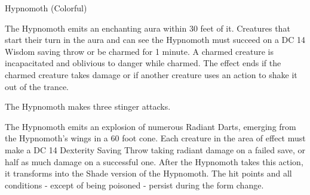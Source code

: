 \vfill\eject\vspace*{-5.6em}
\begin{DndMonster}[width=0.5\textwidth]{Hypnomoth (Colorful)}
	
	\DndMonsterBasics[
		armor-class = {15 (natural armor)},
		hit-points  = {\DndDice{15d10 + 30}},
		speed       = {20 ft., fly 60 ft.},
	]
	
	\DndMonsterAbilityScores[
		str = 12,
		dex = 16,
		con = 14,
		int = 6,
		wis = 14,
		cha = 10,
	]
	
	\DndMonsterDetails[
		skills = {Perception +4},
		senses = {Darkvision 60 ft., passive Perception 14},
		languages = {Understands Sylvan but can't speak},
		challenge =5,
	]
	
	The Hypnomoth emits an enchanting aura within 30 feet of it. Creatures that start their turn in the aura and can see the Hypnomoth must succeed on a DC 14 Wisdom saving throw or be charmed for 1 minute. A charmed creature is incapacitated and oblivious to danger while charmed. The effect ends if the charmed creature takes damage or if another creature uses an action to shake it out of the trance.
	
	The Hypnomoth makes three stinger attacks.   
	
	\DndMonsterAttack[
		name=Stinger,
		distance=melee, %
		mod=+5,
		reach=5,
		targets=one target,
		dmg={\DndDice{1d8 + 3}},
		dmg-type=piercing,
		plus-dmg={\DndDice{2d6}},
		plus-dmg-type=poison,
	]
	
	\DndMonsterAttack[
		name=Radiant Dart,
		distance=melee, %
		mod=+5,
		reach=120,
		targets=one target,
		dmg={\DndDice{1d12 + 3}},
		dmg-type=radiant,
	]
	
	The Hypnomoth emits an explosion of numerous Radiant Darts, emerging from the Hypnomoth's wings in a 60 foot cone. Each creature in the area of effect must make a DC 14 Dexterity Saving Throw taking  radiant damage on a failed save, or half as much damage on a successful one.  After the Hypnomoth takes this action, it transforms into the Shade version of the Hypnomoth. The hit points and all conditions - except of being poisoned - persist during the form change.
\end{DndMonster}

